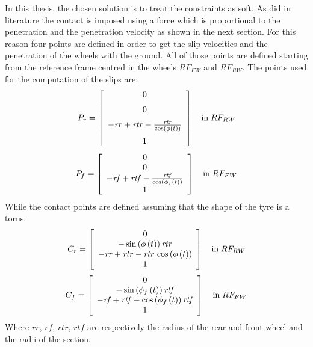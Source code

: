 In this thesis, the chosen solution is to treat the constraints as soft. As did in literature \cite{leonelli2019optimal} the contact is imposed using a force which is proportional to the penetration and the penetration velocity as shown in the next section. For this reason four points are defined in order to get the slip velocities and the penetration of the wheels with the ground. All of those points are defined starting from the reference frame centred in the wheels $RF_{FW}$ and $RF_{RW}$.
The points used for the computation of the slips are:
%
\begin{equation}
P_r =   \left[ \begin {array}{c} 0\\ \noalign{\medskip}0\\ \noalign{\medskip}
-{\it rr}+{\it rtr}-{\frac {{\it rtr}}{\cos \left( \phi \left( t
 \right)  \right) }}\\ \noalign{\medskip}1\end {array} \right] 
\quad \text{in} \; RF_{RW}
\end{equation}
%
\begin{equation}
P_f =   
\left[ \begin{array}{c} 
0\\
0\\ 
-{\it rf}+{\it rtf}-{\frac {{\it rtf}}{\cos \left( \phi_{f} \left( t
 \right)  \right) }}\\
1
\end{array} \right]
\quad \text{in} \; RF_{FW}
\end{equation}
%
While the contact points are defined assuming that the shape of the tyre is a torus. 
%
\begin{equation}
C_r =  \left[ \begin {array}{c} 0\\ 
-\sin \left( \phi
\left( t \right)  \right) {\it rtr}\\ 
-{\it rr}+{
\it rtr}-{\it rtr}\,\cos \left( \phi \left( t \right)  \right)\\ 
1\end {array} \right] 
\quad \text{in} \; RF_{RW}
\end{equation}
%
\begin{equation}
C_f =  \left[ \begin {array}{c} 0\\ 
-\sin \left( \phi_{f}
\left( t \right)  \right) {\it rtf}\\ 
-{\it rf}+{
\it rtf}-\cos \left( \phi_{f} \left( t \right)  \right) {\it rtf}\\
1\end {array} \right] 
\quad \text{in} \; RF_{FW}
\end{equation}
%
Where $rr$, $rf$, $rtr$, $rtf$ are respectively the radius of the rear and front wheel and the radii of the section.
%

